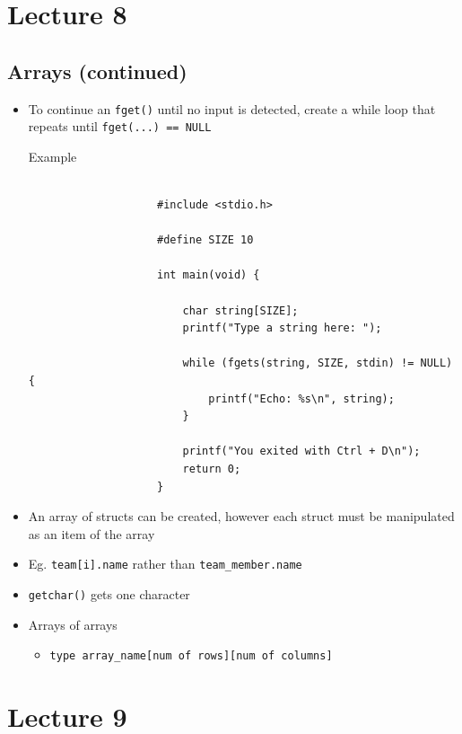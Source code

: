 \documentclass{article}
\begin{document}
\newpage

\section{Lecture 8}
	
	\subsection{Arrays (continued)}

		\begin{itemize}
			\item To continue an \texttt{fget()} until no input is detected, create a while loop that repeats until \texttt{fget(...) == NULL}

			\begin{question}{Example}
				\begin{verbatim}
					
					#include <stdio.h>

					#define SIZE 10

					int main(void) {
						
						char string[SIZE];
						printf("Type a string here: ");

						while (fgets(string, SIZE, stdin) != NULL) {
							printf("Echo: %s\n", string);
						}

						printf("You exited with Ctrl + D\n");
						return 0;
					}

				\end{verbatim}
			\end{question}

			\item An array of structs can be created, however each struct must be manipulated as an item of the array
			\item Eg. \texttt{team[i].name} rather than \texttt{team_member.name}
			\item \texttt{getchar()} gets one character
			\item Arrays of arrays
				\begin{itemize}
					\item \texttt{type array_name[num of rows][num of columns]}
				\end{itemize}
		\end{itemize}

\newpage

\section{Lecture 9}
\end{document}
